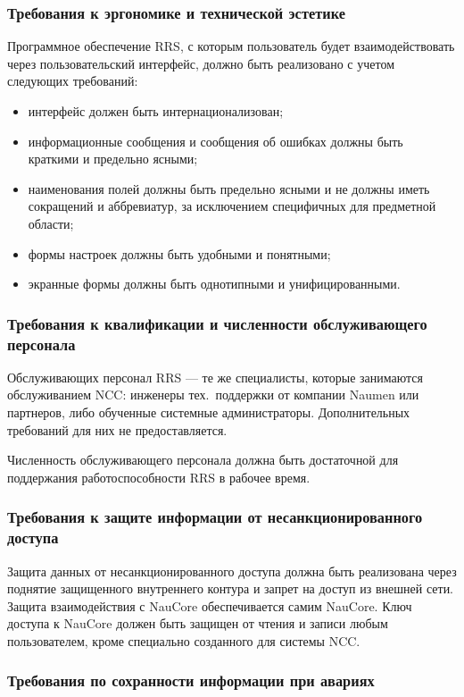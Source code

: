 \subsubsection{Требования к эргономике и технической эстетике}

Программное обеспечение RRS, с которым пользователь будет взаимодействовать
через пользовательский интерфейс,
должно быть реализовано с учетом следующих требований:
\begin{itemize}
    \item интерфейс должен быть интернационализован;
    \item информационные сообщения и сообщения об ошибках должны быть краткими и предельно ясными;
    \item наименования полей должны быть предельно ясными и не должны иметь сокращений и аббревиатур, за исключением специфичных для предметной области;
    \item формы настроек должны быть удобными и понятными;
    \item экранные формы должны быть однотипными и унифицированными.
\end{itemize}

\subsubsection{Требования к квалификации и численности обслуживающего персонала}

Обслуживающих персонал RRS --- те же специалисты, которые занимаются обслуживанием NCC:
инженеры тех.~поддержки от компании Naumen или партнеров,
либо обученные системные администраторы.
Дополнительных требований для них не предоставляется.

Численность обслуживающего персонала должна быть достаточной для поддержания работоспособности RRS в рабочее время.

\subsubsection{Требования к защите информации от несанкционированного доступа}

Защита данных от несанкционированного доступа должна быть реализована через поднятие защищенного внутреннего контура и запрет на доступ из внешней сети.
Защита взаимодействия с NauCore обеспечивается самим NauCore.
Ключ доступа к NauCore должен быть защищен от чтения и записи любым пользователем, кроме специально созданного для системы NCC.

\subsubsection{Требования по сохранности информации при авариях}

